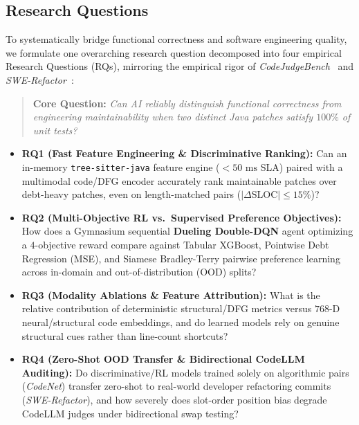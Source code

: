 \documentclass[conference]{IEEEtran}
\begin{document}
\subsection{Research Questions}
To systematically bridge functional correctness and software engineering quality, we formulate one overarching research question decomposed into four empirical Research Questions (RQs), mirroring the empirical rigor of \textit{CodeJudgeBench}~\cite{codejudgebench2025} and \textit{SWE-Refactor}~\cite{swerefactor2025}:

\begin{quote}
\textbf{Core Question:} \textit{Can AI reliably distinguish functional correctness from engineering maintainability when two distinct Java patches satisfy $100\%$ of unit tests?}
\end{quote}

\begin{itemize}
    \item \textbf{RQ1 (Fast Feature Engineering \& Discriminative Ranking):} Can an in-memory \texttt{tree-sitter-java} feature engine ($<50\text{ ms}$ SLA) paired with a multimodal code/DFG encoder accurately rank maintainable patches over debt-heavy patches, even on length-matched pairs ($|\Delta\text{SLOC}| \le 15\%$)?
    \item \textbf{RQ2 (Multi-Objective RL vs.\ Supervised Preference Objectives):} How does a Gymnasium sequential \textbf{Dueling Double-DQN} agent optimizing a $4$-objective reward compare against Tabular XGBoost, Pointwise Debt Regression (MSE), and Siamese Bradley-Terry pairwise preference learning across in-domain and out-of-distribution (OOD) splits?
    \item \textbf{RQ3 (Modality Ablations \& Feature Attribution):} What is the relative contribution of deterministic structural/DFG metrics versus $768\text{-D}$ neural/structural code embeddings, and do learned models rely on genuine structural cues rather than line-count shortcuts?
    \item \textbf{RQ4 (Zero-Shot OOD Transfer \& Bidirectional CodeLLM Auditing):} Do discriminative/RL models trained solely on algorithmic pairs (\textit{CodeNet}) transfer zero-shot to real-world developer refactoring commits (\textit{SWE-Refactor}), and how severely does slot-order position bias degrade CodeLLM judges under bidirectional swap testing?
\end{itemize}
\end{document}
